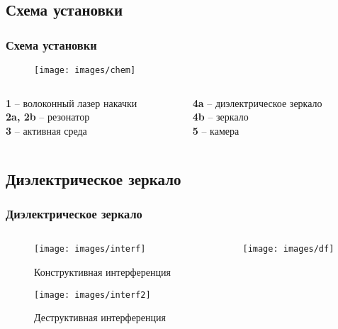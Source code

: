 \documentclass[10pt,pdf,hyperref={unicode}, dvipsnames]{beamer}
\newcommand\frametitless[1]{\subsection{#1}\frametitle{#1}}
\begin{document}
\begin{frame}
	\frametitless{Схема установки}
	\begin{figure}[tb]
		\centering
		\texttt{[image: images/chem]}
	\end{figure}
	\vspace{1cm}
	\begin{columns}
		\begin{column}{0.4\textwidth}
			\textbf{1} -- волоконный лазер накачки\\ 
			\textbf{2a, 2b} -- резонатор\\
			\textbf{3} -- активная среда
		\end{column}
		\begin{column}{0.4\textwidth}
			\textbf{4a} -- диэлектрическое зеркало\\
			\textbf{4b} -- зеркало\\
			\textbf{5} -- камера
		\end{column}
	\end{columns}
\end{frame}
\begin{frame}[t]
	\frametitless{Диэлектрическое зеркало}
	\begin{columns}
		\begin{column}{0.49\textwidth}
			\begin{figure}[h]
				\centering
				\texttt{[image: images/interf]}
				\caption{Конструктивная интерференция}
			\end{figure}	
			\begin{figure}[h]
				\centering
				\texttt{[image: images/interf2]}
				\caption{Деструктивная интерференция}
			\end{figure}			
		\end{column}
		\begin{column}{0.49\textwidth}
			\begin{figure}[h]
				\centering
				\texttt{[image: images/df]}
			\end{figure}	
		\end{column}
	\end{columns}	
\end{frame}

\end{document}

